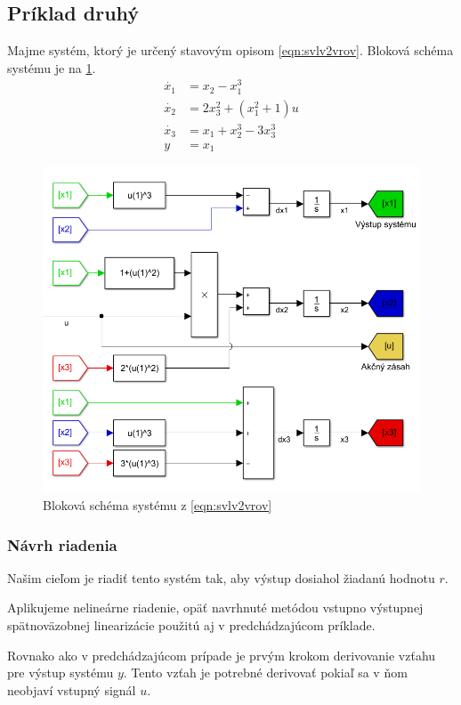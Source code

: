\documentclass[../main.tex]{subfiles}
\begin{document}
	\subsection{Príklad druhý}
	Majme systém, ktorý je určený stavovým opisom \cref{eqn:svlv2vrov}. Bloková schéma systému je na \cref{fig:svlvv2schfig}.
	\begin{equation}
		\begin{aligned}
		\dot{x_1} &= x_2 - x_1^3\\
		\dot{x_2} &= 2x_3^2 + (x_1^2+1)u \\
		\dot{x_3} &= x_1 + x_2^3 - 3x_3^3 \\
		y &= x_1
		\end{aligned}
		\label{eqn:svlv2vrov}
	\end{equation}
	\begin{figure}[h!]
		\centering
		\includegraphics[width=0.8\linewidth]{sysPr2}
		\caption{Bloková schéma systému z \cref{eqn:svlv2vrov}}
		\label{fig:svlvv2schfig}
	\end{figure}
	\subsubsection{Návrh riadenia}
	
	Našim cieľom je riadiť tento systém tak, aby výstup dosiahol žiadanú hodnotu $r$.
	
	Aplikujeme nelineárne riadenie, opäť navrhnuté metódou vstupno výstupnej spätnoväzobnej linearizácie použitú aj v predchádzajúcom príklade. 
	
	Rovnako ako v predchádzajúcom prípade je prvým krokom derivovanie vzťahu pre výstup systému $y$. Tento vzťah je potrebné derivovať pokiaľ sa v ňom neobjaví vstupný signál $u$. 
\end{document}
